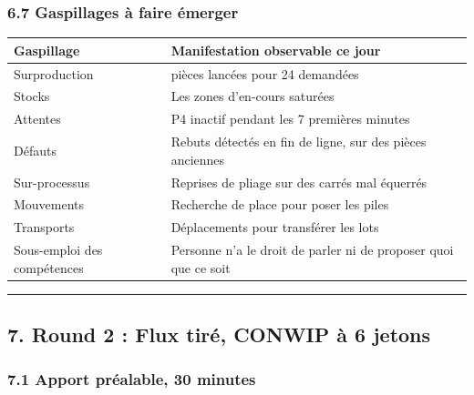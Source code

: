\documentclass[
]{article}
\newcounter{none} %
\begin{document}
\subsubsection{6.7 Gaspillages à faire
émerger}\label{gaspillages-uxe0-faire-uxe9merger}

{\def\LTcaptype{none} %
\begin{longtable}[]{@{}
  >{\raggedright\arraybackslash}p{}
  >{\raggedright\arraybackslash}p{}@{}}
\toprule\noalign{}
\begin{minipage}[b]{\linewidth}\raggedright
Gaspillage
\end{minipage} & \begin{minipage}[b]{\linewidth}\raggedright
Manifestation observable ce jour
\end{minipage} \\
\midrule\noalign{}
\endhead
\bottomrule\noalign{}
\endlastfoot
Surproduction & 40 pièces lancées pour 24 demandées \\
Stocks & Les zones d'en-cours saturées \\
Attentes & P4 inactif pendant les 7 premières minutes \\
Défauts & Rebuts détectés en fin de ligne, sur des pièces anciennes \\
Sur-processus & Reprises de pliage sur des carrés mal équerrés \\
Mouvements & Recherche de place pour poser les piles \\
Transports & Déplacements pour transférer les lots \\
Sous-emploi des compétences & Personne n'a le droit de parler ni de
proposer quoi que ce soit \\
\end{longtable}
}

\begin{center}\rule{0.5\linewidth}{0.5pt}\end{center}

\subsection{7. Round 2 : Flux tiré, CONWIP à 6
jetons}\label{round-2-flux-tiruxe9-conwip-uxe0-6-jetons}

\subsubsection{7.1 Apport préalable, 30
minutes}\label{apport-pruxe9alable-30-minutes}
\end{document}
